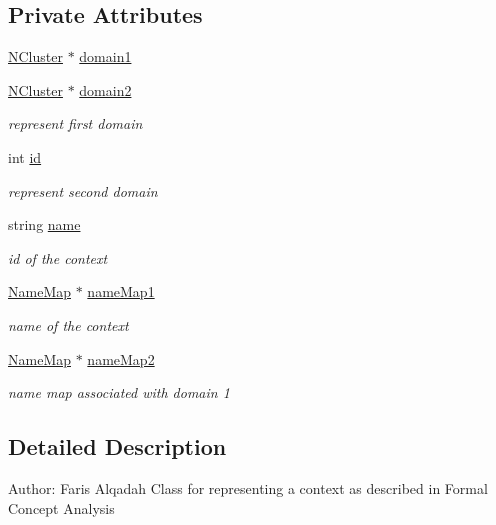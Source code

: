 \subsection*{Private Attributes}
\begin{DoxyCompactItemize}
\item 
\hyperlink{class_n_cluster}{NCluster} $\ast$ \hyperlink{class_context_a8048e137193a79abba0741c75429c5ac}{domain1}
\item 
\hyperlink{class_n_cluster}{NCluster} $\ast$ \hyperlink{class_context_a2e9112268666d45cfb4139d01e7d7019}{domain2}
\begin{DoxyCompactList}\small\item\em represent first domain \item\end{DoxyCompactList}\item 
int \hyperlink{class_context_a134a1f80c8256db2afdb6d6f3096e0d6}{id}
\begin{DoxyCompactList}\small\item\em represent second domain \item\end{DoxyCompactList}\item 
string \hyperlink{class_context_af22c18b4ad495688a68ad4d410009100}{name}
\begin{DoxyCompactList}\small\item\em id of the context \item\end{DoxyCompactList}\item 
\hyperlink{class_name_map}{NameMap} $\ast$ \hyperlink{class_context_a092b46cd54293fd8b18c514fb61c04de}{nameMap1}
\begin{DoxyCompactList}\small\item\em name of the context \item\end{DoxyCompactList}\item 
\hyperlink{class_name_map}{NameMap} $\ast$ \hyperlink{class_context_a24bd477af8de17c09869713cfa06265a}{nameMap2}
\begin{DoxyCompactList}\small\item\em name map associated with domain 1 \item\end{DoxyCompactList}\end{DoxyCompactItemize}


\subsection{Detailed Description}
Author: Faris Alqadah Class for representing a context as described in Formal Concept Analysis

